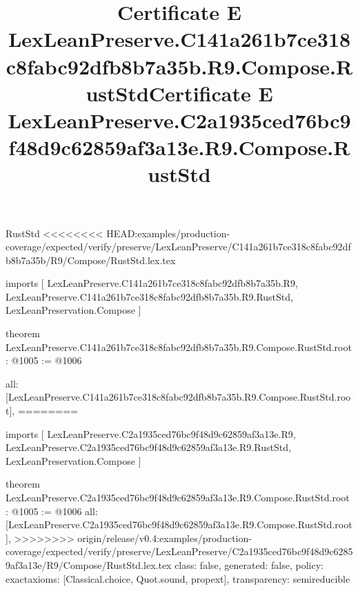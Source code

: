 \begin{lexlean}{RustStd}
<<<<<<<< HEAD:examples/production-coverage/expected/verify/preserve/LexLeanPreserve/C141a261b7ce318c8fabc92dfb8b7a35b/R9/Compose/RustStd.lex.tex
\title{Certificate E LexLeanPreserve.C141a261b7ce318c8fabc92dfb8b7a35b.R9.Compose.RustStd}
\begin{coremodule}
imports [
  LexLeanPreserve.C141a261b7ce318c8fabc92dfb8b7a35b.R9,
  LexLeanPreserve.C141a261b7ce318c8fabc92dfb8b7a35b.R9.RustStd,
  LexLeanPreservation.Compose
]

theorem LexLeanPreserve.C141a261b7ce318c8fabc92dfb8b7a35b.R9.Compose.RustStd.root : @1005 := @1006 {
  all: [LexLeanPreserve.C141a261b7ce318c8fabc92dfb8b7a35b.R9.Compose.RustStd.root],
========
\title{Certificate E LexLeanPreserve.C2a1935ced76bc9f48d9c62859af3a13e.R9.Compose.RustStd}
\begin{coremodule}
imports [
  LexLeanPreserve.C2a1935ced76bc9f48d9c62859af3a13e.R9,
  LexLeanPreserve.C2a1935ced76bc9f48d9c62859af3a13e.R9.RustStd,
  LexLeanPreservation.Compose
]

theorem LexLeanPreserve.C2a1935ced76bc9f48d9c62859af3a13e.R9.Compose.RustStd.root : @1005 := @1006 {
  all: [LexLeanPreserve.C2a1935ced76bc9f48d9c62859af3a13e.R9.Compose.RustStd.root],
>>>>>>>> origin/release/v0.4:examples/production-coverage/expected/verify/preserve/LexLeanPreserve/C2a1935ced76bc9f48d9c62859af3a13e/R9/Compose/RustStd.lex.tex
  class: false,
  generated: false,
  policy: exact{axioms: [Classical.choice, Quot.sound, propext]},
  transparency: semireducible
}


\end{coremodule}}
\end{coremodule}
\end{lexlean}
